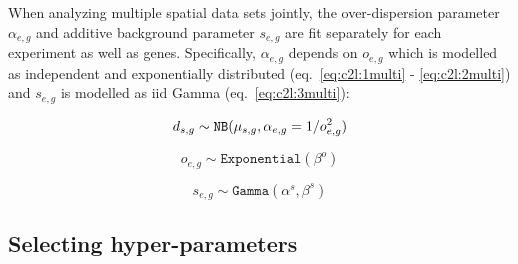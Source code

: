 \documentclass[11pt,a4paper]{article}
\begin{document}
When analyzing multiple spatial data sets jointly, the over-dispersion parameter $\alpha_{e,g}$ and additive background parameter $s_{e,g}$ are fit separately for each experiment as well as genes. Specifically, $\alpha_{e,g}$ depends on $o_{e,g}$ which is modelled as independent and exponentially distributed (eq.~\eqref{eq:c2l:1multi} - \eqref{eq:c2l:2multi}) and $s_{e,g}$ is modelled as iid Gamma (eq.~\eqref{eq:c2l:3multi}):
    \begin{linenomath*} \begin{equation} \label{eq:c2l:1multi}
    d_{s,g} \sim \mathtt{NB}(\mu_{s,g}, \alpha_{e,g} = 1 / o_{e,g} ^ 2) \\
    \end{equation} \end{linenomath*}
    \begin{linenomath*} \begin{equation} \label{eq:c2l:2multi}
    o_{e,g} \sim \mathtt{Exponential}(\beta^o)
    \end{equation} \end{linenomath*}
    \begin{linenomath*} \begin{equation} \label{eq:c2l:3multi}
    s_{e,g} \sim \mathtt{Gamma}(\alpha^s,  \beta^s)
    \end{equation} \end{linenomath*}

\subsection{Selecting hyper-parameters} \label{hyper-parameters}
\end{document}
